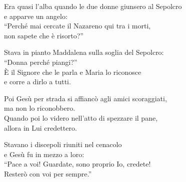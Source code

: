 
\strofa Era quasi l'alba quando le due donne giunsero al Sepolcro\\
e apparve un angelo:\\
``Perché mai cercate il Nazareno qui tra i morti,\\
non sapete che è risorto?''

\spazio

 

\spazio

\strofa Stava in pianto Maddalena sulla soglia del Sepolcro:\\
``Donna perché piangi?''\\
È il Signore che le parla e Maria lo riconosce\\
e corre a dirlo a tutti.

\spazio


\spazio

\strofa Poi Gesù per strada si affiancò agli amici scoraggiati,\\
ma non lo riconobbero.\\
Quando poi lo videro nell'atto di spezzare il pane,\\
allora in Lui credettero.

\spazio


\spazio

\strofa Stavano i discepoli riuniti nel cenacolo\\
e Gesù fu in mezzo a loro:\\
``Pace a voi! Guardate, sono proprio Io, credete!\\
Resterò con voi per sempre.''

\spazio


